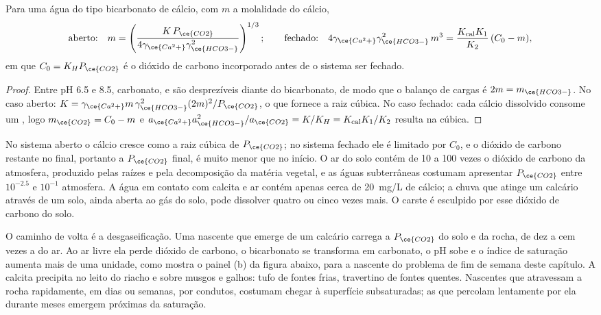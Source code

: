 \begin{theorem}\label{thm:b3:water-rock-interaction:calcite}
Para uma água do tipo bicarbonato de cálcio, com $m$ a molalidade do cálcio,
\[
\text{aberto:}\quad m = \left(\frac{K\,P_{\ce{CO2}}}{4\gamma_{\ce{Ca^2+}}
\gamma_{\ce{HCO3-}}^2}\right)^{1/3};
\qquad
\text{fechado:}\quad 4\gamma_{\ce{Ca^2+}}\gamma_{\ce{HCO3-}}^2\,m^3 =
\frac{K_{\mathrm{cal}}K_1}{K_2}\,(C_0 - m),
\]
em que $C_0 = K_H P_{\ce{CO2}}$ é o dióxido de carbono incorporado antes
de o sistema ser fechado.
\end{theorem}

\begin{proof}
Entre pH 6.5 e 8.5, carbonato,  e  são desprezíveis diante do
bicarbonato, de modo que o balanço de cargas é $2m = m_{\ce{HCO3-}}$. No caso aberto: $K = \gamma
_{\ce{Ca^2+}}m\,\gamma_{\ce{HCO3-}}^2(2m)^2/P_{\ce{CO2}}$, o que fornece a
raiz cúbica. No caso fechado: cada cálcio dissolvido consome um , logo $m_{\ce{CO2}}
= C_0 - m$ e $a_{\ce{Ca^2+}}a_{\ce{HCO3-}}^2/a_{\ce{CO2}} = K/K_H =
K_{\mathrm{cal}}K_1/K_2$ resulta na cúbica.
\end{proof}

No sistema aberto o cálcio cresce como a raiz cúbica de $P_{\ce{CO2}}$; no
sistema fechado ele é limitado por $C_0$, e o dióxido de carbono restante no
final, portanto a $P_{\ce{CO2}}$ final, é muito menor que no início. O ar do
solo contém de 10 a 100 vezes o dióxido de carbono da atmosfera, produzido pelas
raízes e pela decomposição da matéria vegetal, e as águas subterrâneas costumam apresentar
$P_{\ce{CO2}}$ entre $10^{-2.5}$ e $10^{-1}$ atmosfera. A água em
contato com calcita e ar contém apenas cerca de \qty{20}{mg/L} de cálcio; a chuva que
atinge um calcário através de um solo, ainda aberta ao gás do solo, pode dissolver
quatro ou cinco vezes mais. O carste é esculpido por esse dióxido de carbono do solo.

O caminho de volta é a desgaseificação. Uma nascente que emerge de um calcário carrega
a $P_{\ce{CO2}}$ do solo e da rocha, de dez a cem vezes a do
ar. Ao ar livre ela perde dióxido de carbono, o bicarbonato se transforma em
carbonato, o pH sobe e o índice de saturação aumenta mais de uma unidade,
como mostra o painel (b) da figura abaixo, para a nascente do
problema de fim de semana deste capítulo.
A calcita precipita no leito do riacho e sobre musgos e galhos: tufo de
fontes frias, travertino de fontes quentes. Nascentes que atravessam a rocha
rapidamente, em dias ou semanas, por condutos, costumam chegar à superfície
subsaturadas; as que percolam lentamente por ela durante meses emergem próximas
da saturação.

